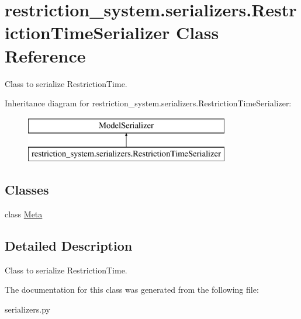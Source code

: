 \hypertarget{classrestriction__system_1_1serializers_1_1RestrictionTimeSerializer}{}\section{restriction\+\_\+system.\+serializers.\+Restriction\+Time\+Serializer Class Reference}
\label{classrestriction__system_1_1serializers_1_1RestrictionTimeSerializer}


Class to serialize Restriction\+Time.  


Inheritance diagram for restriction\+\_\+system.\+serializers.\+Restriction\+Time\+Serializer\+:\begin{figure}[H]
\begin{center}
\leavevmode
\includegraphics[height=2.000000cm]{classrestriction__system_1_1serializers_1_1RestrictionTimeSerializer}
\end{center}
\end{figure}
\subsection*{Classes}
\begin{DoxyCompactItemize}
\item 
class \hyperlink{classrestriction__system_1_1serializers_1_1RestrictionTimeSerializer_1_1Meta}{Meta}
\end{DoxyCompactItemize}


\subsection{Detailed Description}
Class to serialize Restriction\+Time. 

The documentation for this class was generated from the following file\+:\begin{DoxyCompactItemize}
\item 
serializers.\+py\end{DoxyCompactItemize}
